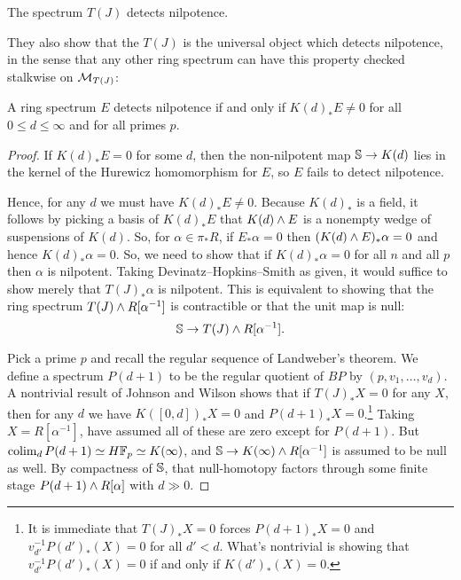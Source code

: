 \begin{theorem}
The spectrum $T(J)$ detects nilpotence.
\end{theorem}

They also show that the $T(J)$ is the universal object which detects nilpotence, in the sense that any other ring spectrum can have this property checked stalkwise on $\M_{T(J)}$:

\begin{theorem}
A ring spectrum $E$ detects nilpotence if and only if $K(d)_* E \ne 0$ for all $0 \le d \le \infty$ and for all primes $p$.
\end{theorem}
\begin{proof}
If $K(d)_* E = 0$ for some $d$, then the non-nilpotent map $\S \to K(d)$ lies in the kernel of the Hurewicz homomorphism for $E$, so $E$ fails to detect nilpotence.

Hence, for any $d$ we must have $K(d)_* E \ne 0$.  Because $K(d)_*$ is a field, it follows by picking a basis of $K(d)_* E$ that $K(d) \sm E$ is a nonempty wedge of suspensions of $K(d)$.  So, for $\alpha \in \pi_* R$, if $E_* \alpha = 0$ then $(K(d) \sm E)_* \alpha = 0$ and hence $K(d)_* \alpha = 0$.  So, we need to show that if $K(d)_* \alpha = 0$ for all $n$ and all $p$ then $\alpha$ is nilpotent.  Taking Devinatz--Hopkins--Smith as given, it would suffice to show merely that $T(J)_* \alpha$ is nilpotent.  This is equivalent to showing that the ring spectrum $T(J) \sm R[\alpha^{-1}]$ is contractible or that the unit map is null: \[\S \to T(J) \sm R[\alpha^{-1}].\]

Pick a prime $p$ and recall the regular sequence of Landweber's theorem.  We define a spectrum $P(d+1)$ to be the regular quotient of $BP$ by $(p, v_1, \ldots, v_d)$.  A nontrivial result of Johnson and Wilson shows that if $T(J)_* X = 0$ for any $X$, then for any $d$ we have $K([0, d])_* X = 0$ and $P(d+1)_* X = 0$.\footnote{It is immediate that $T(J)_* X = 0$ forces $P(d+1)_* X = 0$ and $v_{d'}^{-1} P(d')_*(X) = 0$ for all $d' < d$.  What's nontrivial is showing that $v_{d'}^{-1} P(d')_*(X) = 0$ if and only if $K(d')_*(X) = 0$.}  Taking $X = R[\alpha^{-1}]$, have assumed all of these are zero except for $P(d+1)$.  But $\colim_d P(d+1) \simeq H\F_p \simeq K(\infty)$, and $\S \to K(\infty) \sm R[\alpha^{-1}]$ is assumed to be null as well.  By compactness of $\S$, that null-homotopy factors through some finite stage $P(d+1) \sm R[\alpha]$ with $d \gg 0$.
\end{proof}

